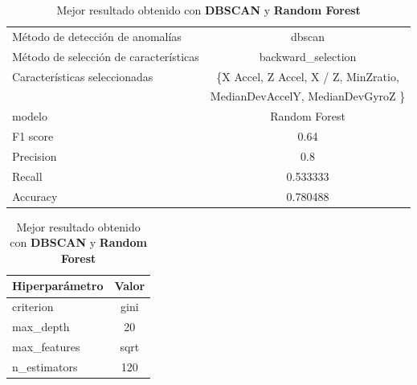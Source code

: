 \begin{appendices}
		\begin{table}[htb]
			\centering
			\caption{Mejor resultado obtenido con \textbf{DBSCAN} y \textbf{Random Forest}}
			\label{table:35}
			\begin{tabular}{lc}
				\toprule
					  Método de detección de anomalías &                                             dbscan \\
				Método de selección de características &                                 backward\_selection \\
						 Características seleccionadas & \{X Accel, Z Accel, X / Z, MinZratio, \\
						                               &        MedianDevAccelY, MedianDevGyroZ \} \\
												modelo &                                      Random Forest \\
											  F1 score &                                               0.64 \\
											 Precision &                                                0.8 \\
												Recall &                                           0.533333 \\
											  Accuracy &                                           0.780488 \\
				\bottomrule
			\end{tabular}
			\newline
			\newline

			\begin{tabular}{lc}
				\toprule
				Hiperparámetro & Valor \\
				\midrule
					 criterion &  gini \\
					 max\_depth &    20 \\
				  max\_features &  sqrt \\
				  n\_estimators &   120 \\
				\bottomrule
			\end{tabular}
			

		\end{table}


\end{appendices}
